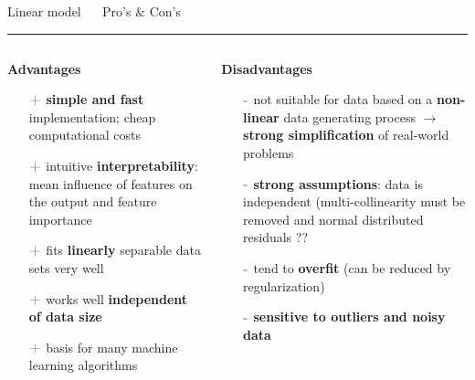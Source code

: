 \documentclass[11pt,compress,t,notes=noshow, xcolor=table]{beamer}
\begin{document}
\LARGE
\begin{frame}{\textcolor{gray!80}{Linear model} ~~ Pro's \& Con's}
\normalsize
\vspace{-0.5cm}
\noindent \textcolor{gray!80}{\rule{\textwidth}{1pt}}

\vspace{0.3cm}

\footnotesize

\begin{columns}[onlytextwidth]
  \begin{column}{0.5\textwidth}
    \textbf{\textcolor{gray!80}{Advantages}}
    \footnotesize
    \begin{itemize}
      \item[$\textbf{\textcolor{gray!80}{+}}$] \textbf{simple and fast} implementation; cheap computational costs
      \item[$\textbf{\textcolor{gray!80}{+}}$] intuitive \textbf{interpretability}: mean influence of features on the output and feature importance
      \item[$\textbf{\textcolor{gray!80}{+}}$] fits \textbf{linearly} separable data sets very well
      \item[$\textbf{\textcolor{gray!80}{+}}$] works well \textbf{independent of data size}
      \item[$\textbf{\textcolor{gray!80}{+}}$] basis for many machine learning algorithms

    \end{itemize}
  \end{column}

  \begin{column}{0.5\textwidth}
    \textbf{\textcolor{gray!80}{Disadvantages}}
    \footnotesize
    \begin{itemize}
      \item[$\textbf{\textcolor{gray!80}{-}}$] not suitable for data based on a \textbf{non-linear} data generating process $\rightarrow$ \textbf{strong simplification} of real-world problems
      
      \item[$\textbf{\textcolor{gray!80}{-}}$] \textbf{strong assumptions}: data is independent (multi-collinearity must be removed and normal distributed residuals ??
      
      \item[$\textbf{\textcolor{gray!80}{-}}$] tend to \textbf{overfit} (can be reduced by regularization)
      
      \item[$\textbf{\textcolor{gray!80}{-}}$] \textbf{sensitive to outliers and noisy data}
    \end{itemize}
  \end{column}
\end{columns}

\vfill

\small


\end{frame}
\end{document}

